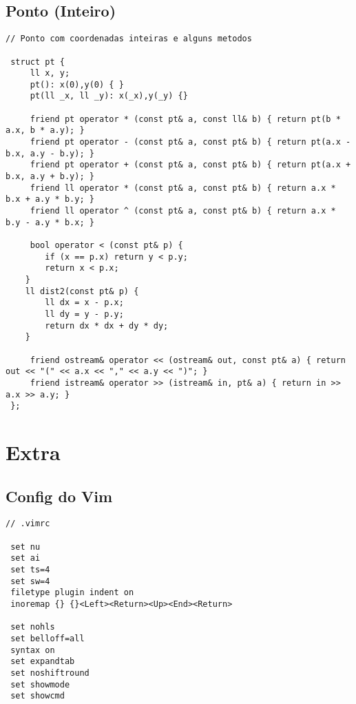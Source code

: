 \documentclass[11pt, a4paper, twoside]{article}
\begin{document}
\subsection{Ponto (Inteiro)}
\begin{lstlisting}
// Ponto com coordenadas inteiras e alguns metodos

 struct pt {
     ll x, y;
     pt(): x(0),y(0) { }
     pt(ll _x, ll _y): x(_x),y(_y) {}
 
     friend pt operator * (const pt& a, const ll& b) { return pt(b * a.x, b * a.y); }
     friend pt operator - (const pt& a, const pt& b) { return pt(a.x - b.x, a.y - b.y); }
     friend pt operator + (const pt& a, const pt& b) { return pt(a.x + b.x, a.y + b.y); }
     friend ll operator * (const pt& a, const pt& b) { return a.x * b.x + a.y * b.y; }
     friend ll operator ^ (const pt& a, const pt& b) { return a.x * b.y - a.y * b.x; }
 
     bool operator < (const pt& p) {
 		if (x == p.x) return y < p.y;
 		return x < p.x;
 	}
 	ll dist2(const pt& p) {
 		ll dx = x - p.x;
 		ll dy = y - p.y;
 		return dx * dx + dy * dy;
 	}
 
     friend ostream& operator << (ostream& out, const pt& a) { return out << "(" << a.x << "," << a.y << ")"; }
     friend istream& operator >> (istream& in, pt& a) { return in >> a.x >> a.y; }
 };
\end{lstlisting}

\pagebreak


%
%

\section{Extra}

\subsection{Config do Vim}
\begin{lstlisting}
// .vimrc

 set nu
 set ai
 set ts=4
 set sw=4
 filetype plugin indent on
 inoremap {} {}<Left><Return><Up><End><Return> 
 
 set nohls
 set belloff=all
 syntax on
 set expandtab
 set noshiftround
 set showmode
 set showcmd
\end{lstlisting}
\end{document}
